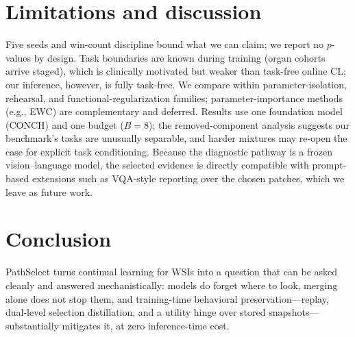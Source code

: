\documentclass{article}
\begin{document}
\section{Limitations and discussion}
\label{sec:limitations}
Five seeds and win-count discipline bound what we can claim; we report no $p$-values by design. Task boundaries are known during training (organ cohorts arrive staged), which is clinically motivated but weaker than task-free online CL; our inference, however, is fully task-free. We compare within parameter-isolation, rehearsal, and functional-regularization families; parameter-importance methods (e.g., EWC) are complementary and deferred. Results use one foundation model (CONCH) and one budget ($B{=}8$); the removed-component analysis suggests our benchmark's tasks are unusually separable, and harder mixtures may re-open the case for explicit task conditioning. Because the diagnostic pathway is a frozen vision--language model, the selected evidence is directly compatible with prompt-based extensions such as VQA-style reporting over the chosen patches, which we leave as future work.

\section{Conclusion}
\label{sec:conclusion}
PathSelect turns continual learning for WSIs into a question that can be asked cleanly and answered mechanistically: models do forget where to look, merging alone does not stop them, and training-time behavioral preservation---replay, dual-level selection distillation, and a utility hinge over stored snapshots---substantially mitigates it, at zero inference-time cost.




\end{document}
